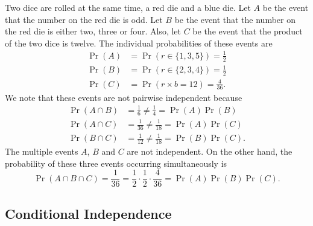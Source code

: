 \begin{example}
Two dice are rolled at the same time, a red die and a blue die.
Let $A$ be the event that the number on the red die is odd.
Let $B$ be the event that the number on the red die is either two, three or four.
Also, let $C$ be the event that the product of the two dice is twelve.
The individual probabilities of these events are
\begin{align*}
\Pr (A) &= \Pr (r \in \{1, 3, 5\}) = \frac{1}{2} \\
\Pr (B) &= \Pr (r \in \{2, 3, 4\}) = \frac{1}{2} \\
\Pr (C) &= \Pr (r \times b = 12) = \frac{4}{36} .
\end{align*}
We note that these events are not pairwise independent because
\begin{align*}
\Pr (A \cap B) &= \frac{1}{6} \neq \frac{1}{4} = \Pr(A) \Pr(B) \\
\Pr (A \cap C) &= \frac{1}{36} \neq \frac{1}{18} = \Pr(A) \Pr(C) \\
\Pr (B \cap C) &= \frac{1}{12} \neq \frac{1}{18} = \Pr(B) \Pr(C) .
\end{align*}
The multiple events $A$, $B$ and $C$ are not independent.
On the other hand, the probability of these three events occurring simultaneously is
\begin{equation*}
\Pr (A \cap B \cap C) = \frac{1}{36}
= \frac{1}{2} \cdot \frac{1}{2} \cdot \frac{4}{36}
= \Pr (A) \Pr (B) \Pr (C) .
\end{equation*}
\end{example}

\subsection{Conditional Independence}

